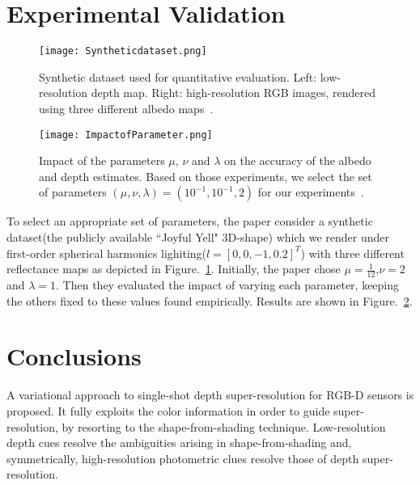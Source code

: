 \documentclass[10pt,twocolumn,letterpaper]{article}
\begin{document}
\section{Experimental Validation}

\begin{figure}[!htp]
\begin{center}
   \texttt{[image: Syntheticdataset.png]}
\end{center}
   \caption{Synthetic dataset used for quantitative evaluation.
Left: low-resolution depth map. Right: high-resolution
RGB images, rendered using three different albedo maps~\cite{Haefner_2018_CVPR}.}
\label{fig:Synthetic}
\end{figure}

\begin{figure}[!htp]
\begin{center}
   \texttt{[image: ImpactofParameter.png]}
\end{center}
   \caption{Impact of the parameters $\mu$, $\nu$ and $\lambda$ on the accuracy of the albedo and depth estimates. Based on those experiments, we select the set of parameters $(\mu,\nu,\lambda)=(10^{-1},10^{-1},2)$ for our experiments~\cite{Haefner_2018_CVPR}.}
\label{fig:Impact}
\end{figure}

To select an appropriate set of parameters, the paper consider a synthetic dataset(the publicly available ``Joyful Yell" 3D-shape) which we render under first-order spherical harmonics lighiting($l=[0,0,-1,0.2]^T$) with three different reflectance maps as depicted in Figure.~\ref{fig:Synthetic}. Initially, the paper chose $\mu=\frac{1}{12}$,$\nu=2$ and $\lambda=1$. Then they evaluated the impact of varying each parameter, keeping the others fixed to these values found empirically. Results are shown in Figure.~\ref{fig:Impact}.



\section{Conclusions}
A variational approach to single-shot depth super-resolution for RGB-D sensors is proposed. It fully exploits the color information in order to guide super-resolution, by resorting to the shape-from-shading technique. Low-resolution depth cues resolve the ambiguities arising in shape-from-shading and, symmetrically, high-resolution photometric clues resolve those of depth super-resolution.

{\small


}
\end{document}
